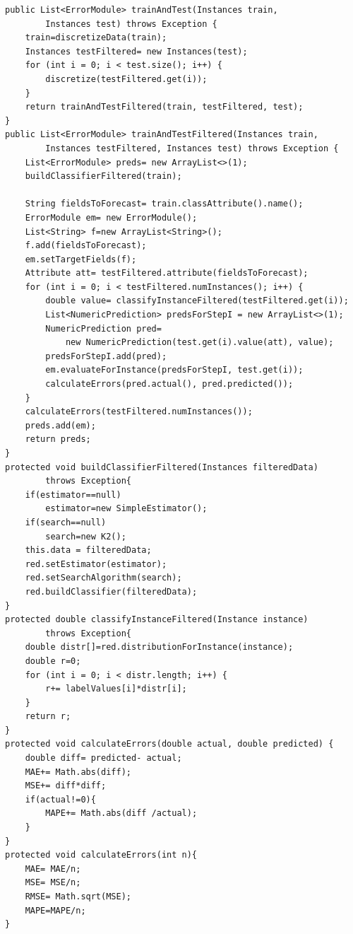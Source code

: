 
\begin{lstlisting}[frame=single]  
public List<ErrorModule> trainAndTest(Instances train,
		Instances test) throws Exception {
	train=discretizeData(train);
	Instances testFiltered= new Instances(test);
	for (int i = 0; i < test.size(); i++) {
		discretize(testFiltered.get(i));
	}
	return trainAndTestFiltered(train, testFiltered, test);
}
public List<ErrorModule> trainAndTestFiltered(Instances train, 
		Instances testFiltered, Instances test) throws Exception {
	List<ErrorModule> preds= new ArrayList<>(1);
	buildClassifierFiltered(train);

	String fieldsToForecast= train.classAttribute().name();
	ErrorModule em= new ErrorModule();
	List<String> f=new ArrayList<String>();
	f.add(fieldsToForecast);
	em.setTargetFields(f);
	Attribute att= testFiltered.attribute(fieldsToForecast);
	for (int i = 0; i < testFiltered.numInstances(); i++) {			
		double value= classifyInstanceFiltered(testFiltered.get(i));
		List<NumericPrediction> predsForStepI = new ArrayList<>(1);
		NumericPrediction pred= 
			new NumericPrediction(test.get(i).value(att), value);
		predsForStepI.add(pred);
		em.evaluateForInstance(predsForStepI, test.get(i));
		calculateErrors(pred.actual(), pred.predicted());
	}
	calculateErrors(testFiltered.numInstances());
	preds.add(em);
	return preds;
}
protected void buildClassifierFiltered(Instances filteredData)
		throws Exception{
	if(estimator==null)
		estimator=new SimpleEstimator();
	if(search==null)
		search=new K2();
	this.data = filteredData; 
	red.setEstimator(estimator);
	red.setSearchAlgorithm(search);
	red.buildClassifier(filteredData);
}
protected double classifyInstanceFiltered(Instance instance) 
		throws Exception{
	double distr[]=red.distributionForInstance(instance);
	double r=0;
	for (int i = 0; i < distr.length; i++) {
		r+= labelValues[i]*distr[i];
	}
	return r;
}
protected void calculateErrors(double actual, double predicted) {
	double diff= predicted- actual;
	MAE+= Math.abs(diff);
	MSE+= diff*diff;
	if(actual!=0){
		MAPE+= Math.abs(diff /actual);
	}
}
protected void calculateErrors(int n){
	MAE= MAE/n;
	MSE= MSE/n;
	RMSE= Math.sqrt(MSE);
	MAPE=MAPE/n;
}
\end{lstlisting}

